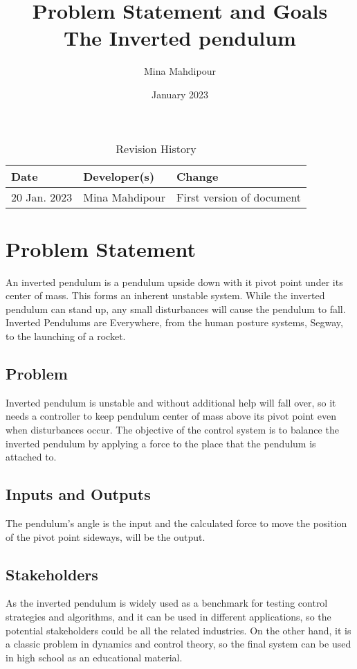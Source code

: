 \documentclass{article}
\title{Problem Statement and Goals\\The Inverted pendulum}
\author{Mina Mahdipour}
\date{January 2023}
\begin{document}
\maketitle

\begin{table}[hp]
\caption{Revision History} \label{TblRevisionHistory}
\begin{tabularx}{\textwidth}{llX}
\toprule
\textbf{Date} & \textbf{Developer(s)} & \textbf{Change}\\
\midrule
20 Jan. 2023 & Mina Mahdipour & First version of document\\
\bottomrule
\end{tabularx}
\end{table}

\section{Problem Statement}

An inverted pendulum is a pendulum upside down with it pivot point under its center of mass. This forms an inherent unstable system. While the inverted pendulum can stand up, any small disturbances will cause the pendulum to fall.
Inverted Pendulums are Everywhere, from  the human posture systems, Segway, to the launching of a rocket.

\subsection{Problem}

Inverted pendulum is unstable and without additional help will fall over, so it needs a controller to keep pendulum center of mass above its pivot point even when disturbances occur.
The objective of the control system is to balance the inverted pendulum by applying a force to the place that the pendulum is attached to.

\subsection{Inputs and Outputs}

The pendulum's angle is the input and the calculated force to move the position of the pivot point sideways, will be the output.

\subsection{Stakeholders}

As the inverted pendulum is widely used as a benchmark for testing control strategies and algorithms, and it can be used in different applications, so the potential stakeholders could be all the related industries. On the other hand, it is a classic problem in dynamics and control theory, so the final system can be used in high school as an educational material.
\end{document}
